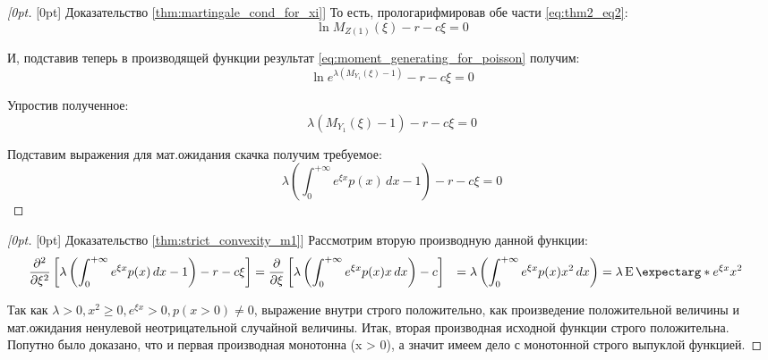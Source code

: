 \documentclass[a4paper,12pt]{article}
\theoremstyle{definition}
\newenvironment{delayedproof}[1]
 {\begin{proof}[\raisedtarget{#1}Доказательство \autoref{#1}]}
 {\end{proof}}
\newcommand{\raisedtarget}[1]{%
  \raisebox{\fontcharht\font`P}[0pt][0pt]{\hypertarget{#1}{}}%
}
\newcommand{\expect}{\operatorname{E}\expectarg}
\begin{document}
\begin{delayedproof}{thm:martingale_cond_for_xi}
То есть, прологарифмировав обе части \eqref{eq:thm2_eq2}:
\begin{equation*}
\ln{M_{Z(1)}(\xi)} - r - c\xi = 0
\end{equation*}

И, подставив теперь в производящей функции результат \eqref{eq:moment_generating_for_poisson} получим:
\begin{equation*}
\ln{e^{\lambda (M_{Y_1}(\xi) - 1)}} - r - c\xi = 0
\end{equation*}

Упростив полученное:
\begin{equation*}
\lambda \left(M_{Y_1}(\xi) - 1\right) - r - c\xi = 0
\end{equation*}

Подставим выражения для мат.ожидания скачка получим требуемое:
\begin{equation*}
\lambda \left(\int_{0}^{+\infty} e^{\xi x} p(x) \,dx - 1\right) - r - c\xi = 0
\end{equation*}

\end{delayedproof}

\begin{delayedproof}{thm:strict_convexity_m1}
Рассмотрим вторую производную данной функции:
\begin{equation*}
\begin{split}
     \pdv[2]{}{\xi} \left[\lambda \left(\int_{0}^{+\infty} e^{\xi x} p(x) \,dx - 1\right) - r - c\xi \right] &= \pdv{}{\xi} \left[\lambda \left(\int_{0}^{+\infty} e^{\xi x} p(x) x \,dx \right) - c \right] &= \lambda \left(\int_{0}^{+\infty} e^{\xi x} p(x) x^{2} \,dx \right) &= \lambda \expect*{e^{\xi x} x^2}
\end{split}
\end{equation*}

Так как $\lambda > 0, x^2 \ge 0, e^{\xi x} > 0, p(x > 0) \neq 0$, выражение внутри строго положительно, как произведение положительной величины и мат.ожидания ненулевой неотрицательной случайной величины. Итак, вторая производная исходной функции строго положительна. Попутно было доказано, что и первая производная монотонна (x > 0), а значит имеем дело с монотонной строго выпуклой функцией.

\end{delayedproof}
\end{document}
